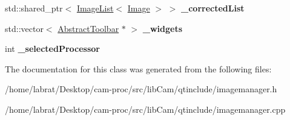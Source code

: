 \begin{DoxyCompactItemize}
\item 
std\+::shared\+\_\+ptr$<$ \hyperlink{classImageList}{Image\+List}$<$ \hyperlink{classImage}{Image} $>$ $>$ {\bfseries \+\_\+corrected\+List}\hypertarget{classImageManager_a742ff03c897fc7f8c70b4a1e0844047b}{}\label{classImageManager_a742ff03c897fc7f8c70b4a1e0844047b}

\item 
std\+::vector$<$ \hyperlink{classAbstractToolbar}{Abstract\+Toolbar} $\ast$ $>$ {\bfseries \+\_\+widgets}\hypertarget{classImageManager_ae6c8127792450450ea818ba41f7e092c}{}\label{classImageManager_ae6c8127792450450ea818ba41f7e092c}

\item 
int {\bfseries \+\_\+selected\+Processor}\hypertarget{classImageManager_a7ac3cb804746be1e5aec2a922f74d46d}{}\label{classImageManager_a7ac3cb804746be1e5aec2a922f74d46d}

\end{DoxyCompactItemize}


The documentation for this class was generated from the following files\+:\begin{DoxyCompactItemize}
\item 
/home/labrat/\+Desktop/cam-\/proc/src/lib\+Cam/qtinclude/imagemanager.\+h\item 
/home/labrat/\+Desktop/cam-\/proc/src/lib\+Cam/qtinclude/imagemanager.\+cpp\end{DoxyCompactItemize}
